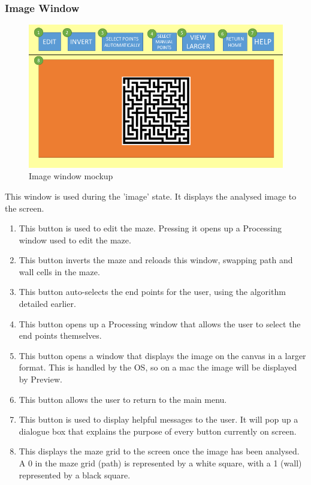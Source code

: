 \documentclass[titlepage]{article}
\begin{document}
\subsubsection{Image Window}
\begin{figure}[H]
  \centering
  \includegraphics[width=12cm]{Slide3.png}
  \caption{Image window mockup}
  \label{fig:dijk}
\end{figure}
This window is used during the 'image' state. It displays the analysed image to the screen.
\begin{enumerate}
\item This button is used to edit the maze. Pressing it opens up a Processing window used to edit the maze.
\item This button inverts the maze and reloads this window, swapping path and wall cells in the maze. 
\item This button auto-selects the end points for the user, using the algorithm detailed earlier.
\item This button opens up a Processing window that allows the user to select the end points themselves.
\item This button opens a window that displays the image on the canvas in a larger format. This is handled by the OS, so on a mac the image will be displayed by Preview.
\item This button allows the user to return to the main menu.
\item This button is used to display helpful messages to the user. It will pop up a dialogue box that explains the purpose of every button currently on screen.
\item This displays the maze grid to the screen once the image has been analysed. A 0 in the maze grid (path) is represented by a white square, with a 1 (wall) represented by a black square. 
\end{enumerate}
\end{document}
